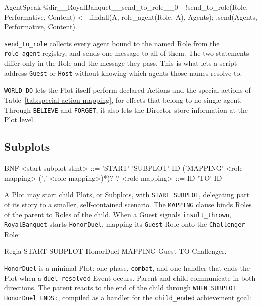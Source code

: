 \begin{codeblock}[]{AgentSpeak}
@dir__RoyalBanquet__send_to_role__0
+!send_to_role(Role, Performative, Content) <-
    .findall(A, role_agent(Role, A), Agents);
    .send(Agents, Performative, Content).
\end{codeblock}
 
\lstinline|send_to_role| collects every agent bound to the named Role from the \lstinline|role_agent| registry, and sends one message to all of them. The two statements differ only in the Role and the message they pass. This is what lets a script address \lstinline|Guest| or \lstinline|Host| without knowing which agents those names resolve to.

\lstinline|WORLD DO| lets the Plot itself perform declared Actions and the special actions of Table~\ref{tab:special-action-mapping}, for effects that belong to no single agent. Through \lstinline|BELIEVE| and \lstinline|FORGET|, it also lets the Director store information at the Plot level.
 
\subsection{Subplots}
\label{sec:subplots}
 
\begin{codeblock}[]{BNF}
    <start-subplot-stmt>     ::= 'START' 'SUBPLOT' ID ('MAPPING' <role-mapping> (',' <role-mapping>)*)? '.'
    <role-mapping>           ::= ID 'TO' ID
\end{codeblock}
 
A Plot may start child Plots, or Subplots, with \lstinline|START SUBPLOT|, delegating part of its story to a smaller, self-contained scenario. The \lstinline|MAPPING| clause binds Roles of the parent to Roles of the child. When a Guest signals \lstinline|insult_thrown|, \lstinline|RoyalBanquet| starts \lstinline|HonorDuel|, mapping its \lstinline|Guest| Role onto the \lstinline|Challenger| Role:
 
\begin{codeblock}[]{Regia}
START SUBPLOT HonorDuel MAPPING Guest TO Challenger.
\end{codeblock}
 
\lstinline|HonorDuel| is a minimal Plot: one phase, \lstinline|combat|, and one handler that ends the Plot when a \lstinline|duel_resolved| Event occurs. Parent and child communicate in both directions. The parent reacts to the end of the child through \lstinline|WHEN SUBPLOT HonorDuel ENDS:|, compiled as a handler for the \lstinline|child_ended| achievement goal:
 
